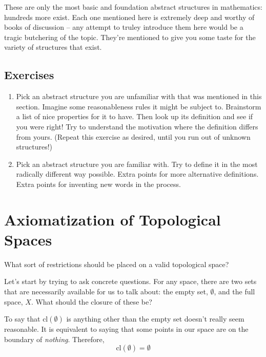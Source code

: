 \documentclass{report}
\newcommand{\cl}{\mathrm{cl}}
\begin{document}
These are only the most basic and foundation abstract structures in mathematics: hundreds more exist. Each one mentioned here is extremely deep and worthy of books of discussion -- any attempt to truley introduce them here would be a tragic butchering of the topic. They're mentioned to give you some taste for the variety of structures that exist. 

\subsection*{Exercises}

\begin{enumerate}

\item Pick an abstract structure you are unfamiliar with that was mentioned in this section. Imagine some reasonableness rules it might be subject to. Brainstorm a list of nice properties for it to have. Then look up its definition and see if you were right! Try to understand the motivation where the definition differs from yours. (Repeat this exercise as desired, until you run out of unknown structures!)

\item Pick an abstract structure you are familiar with. Try to define it in the most radically different way possible. Extra points for more alternative definitions. Extra points for inventing new words in the process.

\end{enumerate}

\section{Axiomatization of Topological Spaces}

What sort of restrictions should be placed on a valid topological space?

Let's start by trying to ask concrete questions. For any space, there are two sets that are necessarily available for us to talk about: the empty set, $∅$, and the full space, $X$. What should the closure of these be?

To say that $\cl(∅)$ is anything other than the empty set doesn't really seem reasonable. It is equivalent to saying that some points in our space are on the boundary of \emph{nothing}. Therefore, 
\begin{equation}
\cl(∅) = ∅ \tag{Closure 1}
\end{equation}
\end{document}
